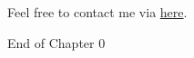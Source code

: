 \documentclass{beamer}
\begin{document}
\begin{frame}{}
\begin{center}
\Large{Feel free to contact me via \href{mailto:politics.tchsiao@gmail.com}{here}.}
\end{center}
\end{frame}
\begin{frame}{}
\begin{center}
\Large{End of Chapter 0}
\end{center}
\end{frame}
\end{document}

